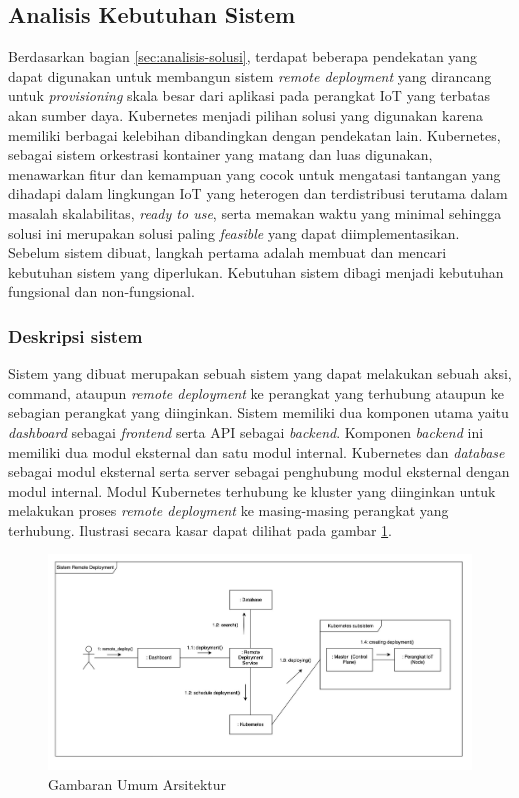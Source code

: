 \subsection{Analisis Kebutuhan Sistem}
\label{sec:analisis-kebutuhan-sistem}

Berdasarkan bagian \ref{sec:analisis-solusi}, terdapat beberapa pendekatan yang dapat digunakan untuk membangun sistem \textit{remote deployment} yang dirancang untuk \textit{provisioning} skala besar dari aplikasi pada perangkat IoT yang terbatas akan sumber daya. Kubernetes menjadi pilihan solusi yang digunakan karena memiliki berbagai kelebihan dibandingkan dengan pendekatan lain. Kubernetes, sebagai sistem orkestrasi kontainer yang matang dan luas digunakan, menawarkan fitur dan kemampuan yang cocok untuk mengatasi tantangan yang dihadapi dalam lingkungan IoT yang heterogen dan terdistribusi terutama dalam masalah skalabilitas, \textit{ready to use}, serta memakan waktu yang minimal sehingga solusi ini merupakan solusi paling \textit{feasible} yang dapat diimplementasikan. Sebelum sistem dibuat, langkah pertama adalah membuat dan mencari kebutuhan sistem yang diperlukan. Kebutuhan sistem dibagi menjadi kebutuhan fungsional dan non-fungsional.

\subsubsection{Deskripsi sistem}
Sistem yang dibuat merupakan sebuah sistem yang dapat melakukan sebuah aksi, command, ataupun \textit{remote deployment} ke perangkat yang terhubung ataupun ke sebagian perangkat yang diinginkan. Sistem memiliki dua komponen utama yaitu \textit{dashboard} sebagai \textit{frontend} serta API sebagai \textit{backend}. Komponen \textit{backend} ini memiliki dua modul eksternal dan satu modul internal. Kubernetes dan \textit{database} sebagai modul eksternal serta server sebagai penghubung modul eksternal dengan modul internal. Modul Kubernetes terhubung ke kluster yang diinginkan untuk melakukan proses \textit{remote deployment} ke masing-masing perangkat yang terhubung. Ilustrasi secara kasar dapat dilihat pada gambar \ref{fig:gambaran-umum-arsitektur}.

\begin{figure}[ht]
  \centering
  \includegraphics[width=1\textwidth]{resources/chapter-3/gambaran-umum-arsitektur-updated.jpg}
  \caption{Gambaran Umum Arsitektur}
  \label{fig:gambaran-umum-arsitektur}
\end{figure}

\pagebreak






